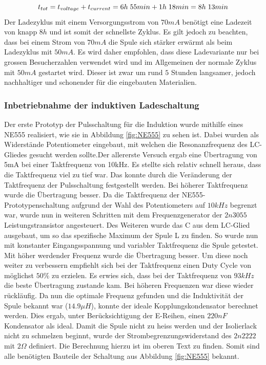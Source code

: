 \begin{equation}
\centering
t_{tot}=t_{voltage}+t_{current}=6h\thickspace 55min + 1h\thickspace 18min = 8h\thickspace 13min
\label{eq:SchnellGesamt}
\end{equation}
Der Ladezyklus mit einem Versorgungsstrom von $70mA$ benötigt eine Ladezeit von knapp $8h$ und ist somit der schnellste Zyklus. Es gilt jedoch zu beachten, dass bei einem Strom von $70mA$ die Spule sich stärker erwärmt als beim Ladezyklus mit $50mA$. Es wird daher empfohlen, dass diese Ladevariante nur bei grossen Besucherzahlen verwendet wird und im Allgemeinen der normale Zyklus mit $50mA$ gestartet wird. Dieser ist zwar um rund $5$ Stunden langsamer, jedoch nachhaltiger und schonender für die eingebauten Materialien.

\subsubsection*{Inbetriebnahme der induktiven Ladeschaltung}\label{sec:erkenntnisse}

Der erste Prototyp der Pulsschaltung für die Induktion wurde mithilfe eines NE555 realisiert, wie sie in Abbildung \ref{fig:NE555} zu sehen ist. Dabei wurden als Widerstände Potentiometer eingebaut, mit welchen die Resonanzfrequenz des LC-Gliedes gesucht werden sollte.Der allererste Versuch ergab eine Übertragung von 5mA bei einer Taktfrequenz von 10kHz. Es stellte sich relativ schnell heraus, dass die Taktfrequenz viel zu tief war. Das konnte durch die Veränderung der Taktfrequenz der Pulsschaltung festgestellt werden. Bei höherer Taktfrequenz wurde die Übertragung besser. Da die Taktfrequenz der NE555-Prototypenschaltung aufgrund der Wahl des Potentiometers auf $10kHz$ begrenzt war, wurde nun in weiteren Schritten mit dem Frequenzgenerator der $2n3055$ Leistungstransistor angesteuert. Des Weiteren wurde das C aus dem LC-Glied ausgebaut, um so das spezifische Maximum der Spule L zu finden. So wurde nun mit konstanter Eingangsspannung und variabler Taktfrequenz die Spule getestet. Mit höher werdender Frequenz wurde die Übertragung besser. Um diese noch weiter zu verbessern empfiehlt sich bei der Taktfrequenz einen Duty Cycle von möglichst $50\%$ zu erzielen. Es erwies sich, dass bei der Taktfrequenz von $93kHz$ die beste Übertragung zustande kam. Bei höheren Frequenzen war diese wieder rückläufig. Da nun die optimale Frequenz gefunden und die Induktivität der Spule bekannt war ($14.9\mu H$), konnte der ideale Kopplungskondensator berechnet werden. Dies ergab, unter Berücksichtigung der E-Reihen, einen $220nF$ Kondensator als ideal. Damit die Spule nicht zu heiss werden und der Isolierlack nicht zu schmelzen beginnt, wurde der Strombegrenzungswiderstand des $2n2222$ mit $2\Omega$ definiert. Die Berechnung hierzu ist im oberen Text zu finden. Somit sind alle benötigten Bauteile der Schaltung aus Abbildung \ref{fig:NE555} bekannt.

